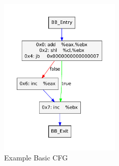 \begin{figure}[!p]
  \begin{center}
    \includegraphics[height=3in]{chap-examples/basiccfg.pdf}
  \end{center}
  \caption{Example Basic CFG}
  \label{fig:basiccfg}
\end{figure}

